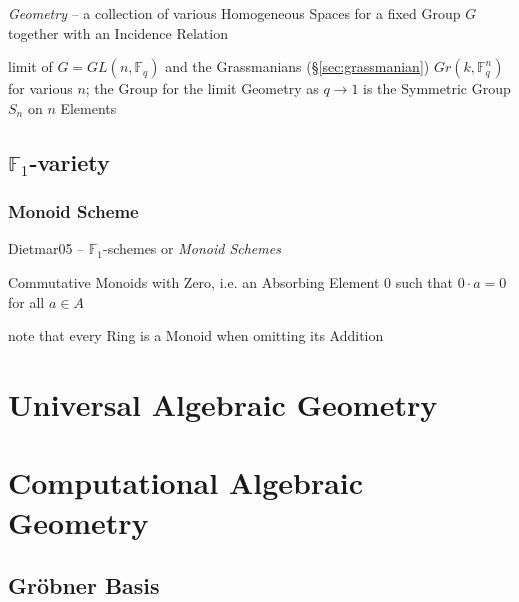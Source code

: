 \emph{Geometry} -- a collection of various Homogeneous Spaces for a fixed Group
$G$ together with an Incidence Relation

limit of $G = GL(n,\mathbb{F}_q)$ and the Grassmanians (\S\ref{sec:grassmanian})
$Gr(k,\mathbb{F}^n_q)$ for various $n$; the Group for the limit Geometry as
$q \rightarrow 1$ is the Symmetric Group $S_n$ on $n$ Elements



\subsection{$\mathbb{F}_1$-variety}\label{sec:f1_variety}

\subsubsection{Monoid Scheme}\label{sec:monoid_scheme}

Dietmar05 -- $\mathbb{F}_1$-schemes or \emph{Monoid Schemes}

Commutative Monoids with Zero, i.e. an Absorbing Element $0$ such that $0 \cdot
a = 0$ for all $a \in A$

note that every Ring is a Monoid when omitting its Addition



\section{Universal Algebraic Geometry}\label{sec:universal_geometry}

\section{Computational Algebraic Geometry}
\label{sec:computational_algebraic_geometry}

\subsection{Gr\"obner Basis}\label{sec:grobner_basis}\hfill

